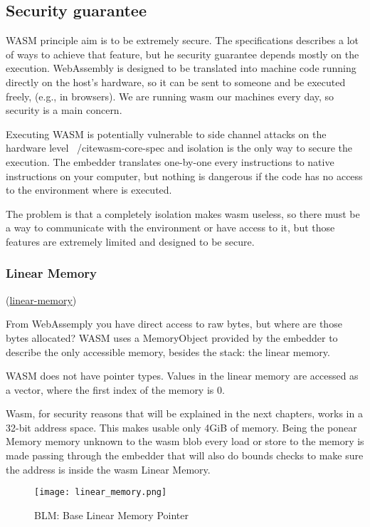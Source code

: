 \documentclass[../main.tex]{subfiles}
\begin{document}
\subsection{Security guarantee}

WASM principle aim is to be extremely secure. The specifications describes a lot of ways to achieve that feature, but he security guarantee depends mostly on the execution. WebAssembly is designed to be translated into machine code running directly on the host’s hardware, so it can be sent to someone and be executed freely, (e.g., in browsers). We are running wasm our machines every day, so security is a main concern.

Executing WASM is potentially vulnerable to side channel attacks on the hardware level ~/cite{wasm-core-spec} and isolation is the only way to secure the execution.  The embedder translates one-by-one every instructions to native instructions on your computer, but nothing is dangerous if the code has no access to the environment where is executed.

The problem is that a completely isolation makes wasm useless, so there must be a way to communicate with the environment or  have access to it, but those features are extremely limited and designed to be secure.

\subsubsection{Linear Memory}
(\href{}{linear-memory})

From WebAssemply you have direct access to raw bytes, but where are  those bytes allocated? WASM uses a MemoryObject provided by the embedder to describe the only accessible memory, besides the stack: the linear memory.~\cite{linear-memory}

WASM does not have pointer types. Values in the linear memory are accessed as a vector, where the first index of the memory is 0.

Wasm, for security reasons that will be explained in the next chapters, works in a 32-bit address space. This makes usable only 4GiB of memory. Being the ponear Memory memory unknown to the wasm blob every load or store to the memory is made passing through the embedder that will also do bounds checks to make sure the address is inside the wasm Linear Memory.


\begin{figure}[h]
  \centering
  \texttt{[image: linear\_memory.png]}
  \caption{BLM: Base Linear Memory Pointer}
  \label{fig:linear_memory}
\end{figure}
\end{document}
